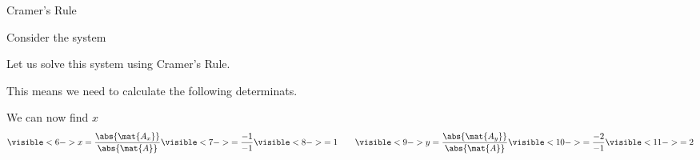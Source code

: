 \documentclass{beamer}
\begin{document}
\begin{frame}{Cramer's Rule}
\begin{example}
Consider the system
\begin{center}
\end{center}\pause
Let us solve this system using Cramer's Rule.

This means we need to calculate the following determinats.
\begin{center}
\end{center}
We can now find $x$ 
\begin{equation*}
\visible<6->{x=\dfrac{\abs{\mat{A_x}}}{\abs{\mat{A}}}\visible<7->{=\dfrac{-1}{-1}\visible<8->{=1}}}
\qquad
\visible<9->{y=\dfrac{\abs{\mat{A_y}}}{\abs{\mat{A}}}\visible<10->{=\dfrac{-2}{-1}\visible<11->{=2}}}
\end{equation*}
\end{example}
\end{frame}
\end{document}
